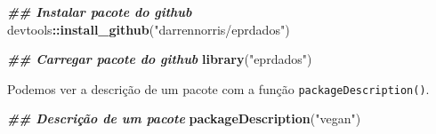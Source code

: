 \documentclass[
]{article}
\newenvironment{Shaded}{\begin{snugshade}}{\end{snugshade}}
\newcommand{\DocumentationTok}[1]{\textcolor[rgb]{0.56,0.35,0.01}{\textbf{\textit{#1}}}}
\newcommand{\FunctionTok}[1]{\textcolor[rgb]{0.13,0.29,0.53}{\textbf{#1}}}
\newcommand{\NormalTok}[1]{#1}
\newcommand{\SpecialCharTok}[1]{\textcolor[rgb]{0.81,0.36,0.00}{\textbf{#1}}}
\newcommand{\StringTok}[1]{\textcolor[rgb]{0.31,0.60,0.02}{#1}}
\begin{document}
\begin{Shaded}
\begin{Highlighting}[]
\DocumentationTok{\#\# Instalar pacote do github}
\NormalTok{devtools}\SpecialCharTok{::}\FunctionTok{install\_github}\NormalTok{(}\StringTok{"darrennorris/eprdados"}\NormalTok{)}

\DocumentationTok{\#\# Carregar pacote do github}
\FunctionTok{library}\NormalTok{(}\StringTok{"eprdados"}\NormalTok{)}
\end{Highlighting}
\end{Shaded}

Podemos ver a descrição de um pacote com a função \texttt{packageDescription()}.

\begin{Shaded}
\begin{Highlighting}[]
\DocumentationTok{\#\# Descrição de um pacote}
\FunctionTok{packageDescription}\NormalTok{(}\StringTok{"vegan"}\NormalTok{)}
\end{Highlighting}
\end{Shaded}
\end{document}

